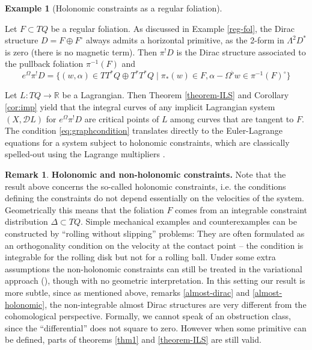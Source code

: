 \documentclass[a4paper,12pt]{amsart}
\theoremstyle{definition}
\newtheorem{Remark}[Definition]{Remark}
\newtheorem{Example}[Definition]{Example}
\begin{document}
\begin{Example}[Holonomic constraints as a regular foliation] \label{holonomic}


Let $F\subset TQ$ be a regular foliation. As discussed in Example \ref{reg-fol}, the Dirac structure $D=F\oplus F^\circ$ always admits a {horizontal primitive}, as the 2-form in $\Lambda^2D^*$ is zero (there is no magnetic term). Then $\pi^!D$ is the Dirac structure associated to the pullback foliation $\pi^{-1}(F)$ and 
$$e^\Omega\pi^!D=\{ (w, \alpha)  \in TT^*Q \oplus T^*T^*Q \;|\;   
  \pi_*(w) \in F, \alpha - \Omega^{\flat} w \in \pi^{-1}(F)^\circ    \}$$

Let $L:TQ\to\mathbb R$ be a Lagrangian.
Then Theorem \ref{theorem-ILS} and Corollary \ref{cor:imp} yield that the integral curves of any implicit Lagrangian system $(X,\mathcal DL)$ for $e^\Omega\pi^!D$ are critical points of $L$ among curves that are tangent to $F$. The condition 
\eqref{eq:graphcondition}
translates directly to the Euler-Lagrange equations for a system subject to holonomic constraints, which are classically spelled-out using the Lagrange multipliers \cite{lagrange}. 

\begin{Remark}

 \textbf{Holonomic and non-holonomic constraints.}
Note that the result above concerns the so-called holonomic constraints, i.e. the conditions defining the constraints do not depend essentially on the velocities of the system. Geometrically this means that the foliation $F$ comes from an integrable constraint distribution $\Delta \subset TQ$. Simple mechanical examples and counterexamples can be constructed by ``rolling without slipping'' problems: They are often formulated as an orthogonality condition on the velocity at the contact point -- the condition is integrable for the rolling disk but not for a rolling ball. Under some extra assumptions the non-holonomic constraints can still be treated in the variational approach {(\cite{YoMa}), though with no geometric interpretation. }
In this setting our result is more subtle, since as mentioned above, remarks \ref{almost-dirac} and \ref{almost-holonomic}, the non-integrable almost Dirac structures are very different from the cohomological perspective. {Formally, we cannot speak of an obstruction class, since the ``differential'' does not square to zero. 
However when some primitive can be defined, parts of theorems \ref{thm1} and \ref{theorem-ILS} are still valid.} 
\end{Remark}

\end{Example}
\end{document}
